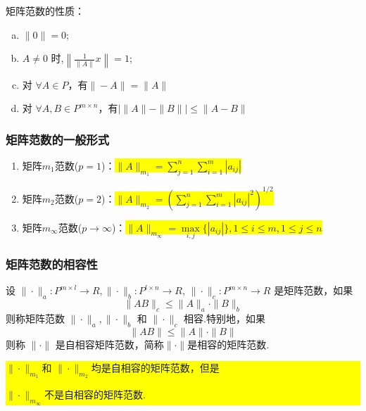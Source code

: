 \noindent 矩阵范数的性质：
\begin{enumerate}[(a)]
	\item \( \|0\|=0 \);
	\item \( A \neq 0 \) 时,\( \left\|\frac{1}{\|A\|} x\right\|=1 \);
	\item 对 $\forall A \in P$，有$\|-A\|=\|A\|$
	\item 对 $\forall A, B \in P^{m\times n}$，有$\left|\|A\|-\|B\| \right|  \leq \|A-B\|$
\end{enumerate}

 \subsubsection{矩阵范数的一般形式}
\begin{enumerate}
	\item 矩阵$m_1$范数($p=1$)：\colorbox{yellow}{$\| A\|_{m_1}=\sum\limits_{j=1}^{n}\sum\limits_{i=1}^{m}|a_{ij}|$}
	\item 矩阵$m_2$范数($p=2$)：\colorbox{yellow}{$\| A\|_{m_2}=\left(\sum\limits_{j=1}^{n}\sum\limits_{i=1}^{m}|a_{ij}|^2\right)^{1/2}$}
	\item 矩阵$m_\infty$范数($p\rightarrow\infty$)：\colorbox{yellow}{$\| A\|_{m_\infty}=\max\limits_{i,j}\{|a_{ij}|\}, 1\leq i\leq m,1\leq j\leq n $}
\end{enumerate}

\subsubsection{矩阵范数的相容性}

\begin{definition}
	设 \( \|\cdot\|_{a}: P^{m \times l} \rightarrow R,\|\cdot\|_{b}: P^{l \times n} \rightarrow R \), \( \|\cdot\|_{c}: P^{m \times n} \rightarrow R \) 是矩阵范数，如果
	\[
	\|A B\|_{c} \leq\|A\|_{a} \cdot\|B\|_{b}
	\]
	则称矩阵范数 \( \|\cdot\|_{a},\|\cdot\|_{b} \) 和 \( \|\cdot\|_{c} \) 相容.特别地，如果
	\[
	 \|A B\| \leq\|A\| \cdot\|B\|
	\]
	则称 \( \|\cdot\| \) 是自相容矩阵范数，简称\( \|\cdot\| \)是相容的矩阵范数.
\end{definition}
\begin{note}
	 \colorbox{yellow}{$\|\cdot\|_{m_1}$和 $\|\cdot\|_{m_2}$均是自相容的矩阵范数，但是
	 
	 $\|\cdot\|_{m_\infty}$不是自相容的矩阵范数.}
\end{note}


